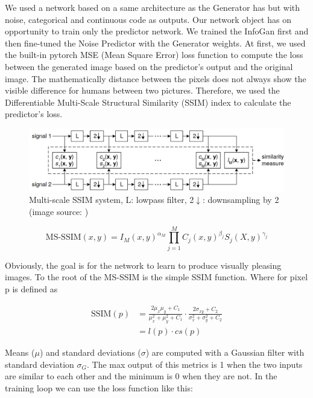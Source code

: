 \documentclass[10pt,journal,compsoc]{IEEEtran}
\begin{document}
We used a network based on a same architecture as the Generator has but with noise, categorical and continuous code as outputs. Our network object has on opportunity to train only the predictor network. We trained the InfoGan first and then fine-tuned the Noise Predictor with the Generator weights. At first, we used the built-in pytorch MSE (Mean Square Error) loss function to compute the loss between the generated image based on the predictor’s output and the original image. The mathematically distance between the pixels does not always show the visible difference for humans between two pictures. Therefore, we used the Differentiable Multi-Scale Structural Similarity (SSIM) index to calculate the predictor’s loss.

\begin{figure}[t]
	\centering
	\includegraphics[width=\textwidth]{pic/MS-SSIM}
	\caption{Multi-scale SSIM system, L: lowpass filter, 2$\downarrow$: downsampling by 2 (image source: \cite{1292216})}
	\label{fig:ms_ssim}
\end{figure}

\begin{displaymath}
	\mathrm{MS\mbox{-}SSIM}(x,y) = I_M(x,y)^{\alpha_M} \prod_{j=1}^{M} C_j(x,y)^{\beta_j}S_j(X,y)^{\gamma_j}
\end{displaymath}

Obviously, the goal is for the network to learn to produce visually pleasing images. To the root of the MS-SSIM is the simple SSIM function. Where for pixel p is defined as 

\begin{equation}
\begin{aligned}
\mathrm{SSIM}(p) &= \frac{2\mu_x\mu_y + C_1}{\mu_x^2 + \mu_y^2 + C_1}\cdot\frac{2\sigma_{xy} + C_2}{\sigma_x^2 + \sigma_y^2 + C_2} \\ 
&= l(p)\cdot cs(p)
\end{aligned}
\end{equation}

Means ($\mu$) and standard deviations ($\sigma$) are computed with a Gaussian filter with standard deviation $\sigma_G$. The max output of this metrics is 1 when the two inputs are similar to each other and the minimum is 0 when they are not. In the training loop we can use the loss function like this:
\end{document}
